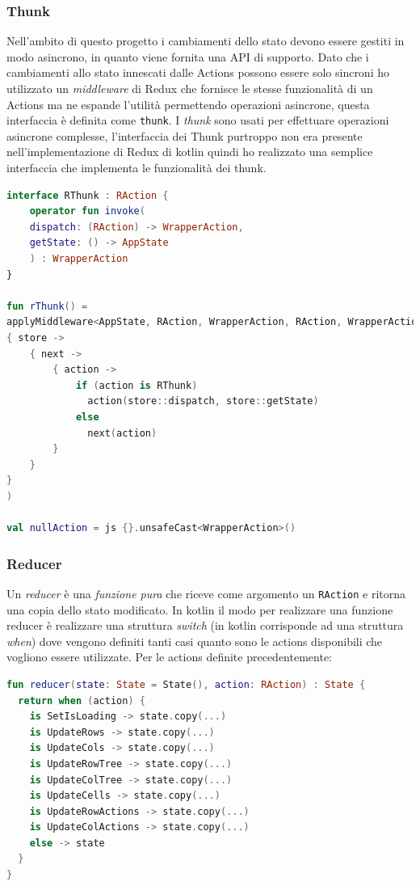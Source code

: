 \subsubsection*{Thunk}
Nell'ambito di questo progetto i cambiamenti dello stato devono essere gestiti in modo asincrono, in quanto viene fornita una API di supporto. Dato che i cambiamenti allo stato innescati dalle Actions possono essere solo sincroni ho utilizzato un \emph{middleware} di Redux che fornisce le stesse funzionalità di un Actions ma ne espande l'utilità permettendo operazioni asincrone, questa interfaccia è definita come \verb|thunk|.
I \emph{thunk} sono usati per effettuare operazioni asincrone complesse, l'interfaccia dei Thunk purtroppo non era presente nell'implementazione di Redux di kotlin quindi ho realizzato una semplice interfaccia che implementa le funzionalità dei thunk.
\begin{lstlisting}[caption={Interfaccia Thunk}, label={lst:bodycells}, language=Kotlin]
interface RThunk : RAction {
	operator fun invoke(
	dispatch: (RAction) -> WrapperAction,
	getState: () -> AppState
	) : WrapperAction
}

fun rThunk() =
applyMiddleware<AppState, RAction, WrapperAction, RAction, WrapperAction>(
{ store ->
	{ next ->
		{ action ->
			if (action is RThunk)
			  action(store::dispatch, store::getState)
			else
			  next(action)
		}
	}
}
)

val nullAction = js {}.unsafeCast<WrapperAction>()
\end{lstlisting}

\subsubsection*{Reducer}
Un \emph{reducer} è una \emph{funzione pura} che riceve come argomento un \verb|RAction| e ritorna una copia dello stato modificato. In kotlin il modo per realizzare una funzione reducer è realizzare una struttura \emph{switch} (in kotlin corrisponde ad una struttura \emph{when}) dove vengono definiti tanti casi quanto sono le actions disponibili che vogliono essere utilizzate. Per le actions definite precedentemente:
\begin{lstlisting}[caption={Interfaccia Thunk}, label={lst:bodycells}, language=Kotlin]
fun reducer(state: State = State(), action: RAction) : State {
  return when (action) {
    is SetIsLoading -> state.copy(...)
    is UpdateRows -> state.copy(...)
    is UpdateCols -> state.copy(...)
    is UpdateRowTree -> state.copy(...)
    is UpdateColTree -> state.copy(...) 
    is UpdateCells -> state.copy(...)
    is UpdateRowActions -> state.copy(...)
    is UpdateColActions -> state.copy(...)
    else -> state
  }
}
\end{lstlisting}


